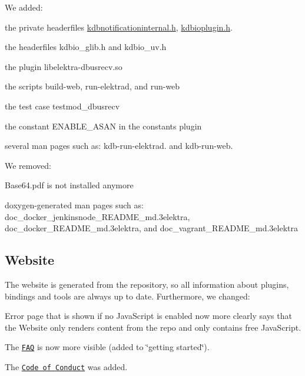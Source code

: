 We added\+:


\begin{DoxyItemize}
\item the private headerfiles {\ttfamily \hyperlink{kdbnotificationinternal_8h}{kdbnotificationinternal.\+h}}, {\ttfamily \hyperlink{kdbioplugin_8h}{kdbioplugin.\+h}}.
\item the headerfiles {\ttfamily kdbio\+\_\+glib.\+h} and {\ttfamily kdbio\+\_\+uv.\+h}
\item the plugin {\ttfamily libelektra-\/dbusrecv.\+so}
\item the scripts {\ttfamily build-\/web}, {\ttfamily run-\/elektrad}, and {\ttfamily run-\/web}
\item the test case {\ttfamily testmod\+\_\+dbusrecv}
\item the constant {\ttfamily E\+N\+A\+B\+L\+E\+\_\+\+A\+S\+AN} in the constants plugin
\item several man pages such as\+: {\ttfamily kdb-\/run-\/elektrad.} and {\ttfamily kdb-\/run-\/web.}
\end{DoxyItemize}

We removed\+:


\begin{DoxyItemize}
\item {\ttfamily Base64.\+pdf} is not installed anymore
\item doxygen-\/generated man pages such as\+: {\ttfamily doc\+\_\+docker\+\_\+jenkinsnode\+\_\+\+R\+E\+A\+D\+M\+E\+\_\+md.\+3elektra}, {\ttfamily doc\+\_\+docker\+\_\+\+R\+E\+A\+D\+M\+E\+\_\+md.\+3elektra}, and {\ttfamily doc\+\_\+vagrant\+\_\+\+R\+E\+A\+D\+M\+E\+\_\+md.\+3elektra}
\end{DoxyItemize}

\subsection*{Website}

The website is generated from the repository, so all information about plugins, bindings and tools are always up to date. Furthermore, we changed\+:


\begin{DoxyItemize}
\item Error page that is shown if no Java\+Script is enabled now more clearly says that the Website only renders content from the repo and only contains free Java\+Script.
\item The \href{https://www.libelektra.org/docgettingstarted/faq}{\tt F\+AQ} is now more visible (added to \char`\"{}getting started\char`\"{}).
\item The \href{https://www.libelektra.org/devgettingstarted/code-of-conduct}{\tt Code of Conduct} was added.
\end{DoxyItemize}

